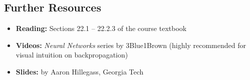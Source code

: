 \documentclass[12pt]{article}
\begin{document}
\subsection{Further Resources}

\begin{itemize}
  \item \textbf{Reading:} Sections 22.1 -- 22.2.3 of the course textbook
  \item \textbf{Videos:} \textit{Neural Networks} series by 3Blue1Brown (highly recommended for visual intuition on backpropagation)
  \item \textbf{Slides:} by Aaron Hillegass, Georgia Tech
\end{itemize}
\end{document}
